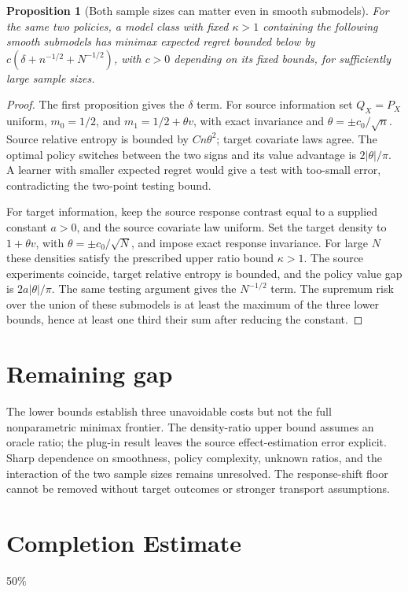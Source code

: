 \documentclass[11pt]{article}
\newtheorem{proposition}[theorem]{Proposition}
\theoremstyle{remark}
\begin{document}
\begin{proposition}[Both sample sizes can matter even in smooth submodels]
For the same two policies, a model class with fixed $\kappa>1$ containing the following smooth submodels has minimax expected regret bounded below by
$c(\delta+n^{-1/2}+N^{-1/2})$, with $c>0$ depending on its fixed bounds, for sufficiently large sample sizes.
\end{proposition}
\begin{proof}
The first proposition gives the $\delta$ term. For source information set $Q_X=P_X$ uniform, $m_0=1/2$, and $m_1=1/2+\theta v$, with exact invariance and $\theta=\pm c_0/\sqrt n$. Source relative entropy is bounded by $C n\theta^2$; target covariate laws agree. The optimal policy switches between the two signs and its value advantage is $2|\theta|/\pi$. A learner with smaller expected regret would give a test with too-small error, contradicting the two-point testing bound.

For target information, keep the source response contrast equal to a supplied constant $a>0$, and the source covariate law uniform. Set the target density to $1+\theta v$, with $\theta=\pm c_0/\sqrt N$, and impose exact response invariance. For large $N$ these densities satisfy the prescribed upper ratio bound $\kappa>1$. The source experiments coincide, target relative entropy is bounded, and the policy value gap is $2a|\theta|/\pi$. The same testing argument gives the $N^{-1/2}$ term. The supremum risk over the union of these submodels is at least the maximum of the three lower bounds, hence at least one third their sum after reducing the constant.
\end{proof}

\section*{Remaining gap}
The lower bounds establish three unavoidable costs but not the full nonparametric minimax frontier. The density-ratio upper bound assumes an oracle ratio; the plug-in result leaves the source effect-estimation error explicit. Sharp dependence on smoothness, policy complexity, unknown ratios, and the interaction of the two sample sizes remains unresolved. The response-shift floor cannot be removed without target outcomes or stronger transport assumptions.

\section{Completion Estimate}
50\%
\end{document}
